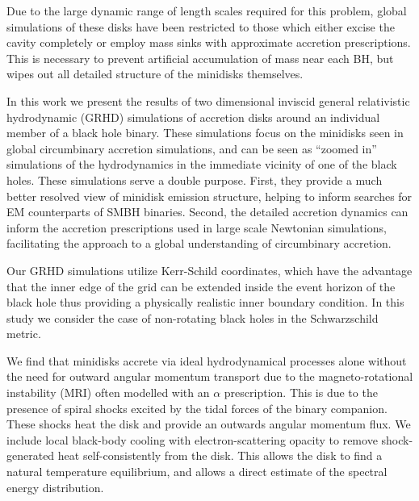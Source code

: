 \documentclass{emulateapj}
\begin{document}
Due to the large dynamic range of length scales required for this problem, global simulations of these disks have been restricted to those which either excise the cavity completely or employ mass sinks with approximate accretion prescriptions.  This is necessary to prevent artificial accumulation of mass near each BH, but wipes out all detailed structure of the minidisks themselves.

In this work we present the results of two dimensional inviscid general relativistic hydrodynamic (GRHD) simulations of accretion disks around an individual member of a black hole binary. These simulations focus on the minidisks seen in global circumbinary accretion simulations, and can be seen as ``zoomed in'' simulations of the hydrodynamics in the immediate vicinity of one of the black holes.  These simulations serve a double purpose. First, they provide a much better resolved view of minidisk emission structure, helping to inform searches for EM counterparts of SMBH binaries.  Second, the detailed accretion dynamics can inform the accretion prescriptions used in large scale Newtonian simulations, facilitating the approach to a global understanding of circumbinary accretion.

Our GRHD simulations utilize Kerr-Schild coordinates, which have the advantage that the inner edge of the grid can be extended inside the event horizon of the black hole thus providing a physically realistic inner boundary condition. In this study we consider the case of non-rotating black holes in the Schwarzschild metric.


  We find that minidisks accrete via ideal hydrodynamical processes alone without the need for outward angular momentum transport due to the magneto-rotational instability (MRI) often modelled with an $\alpha$ prescription.
This is due to the presence of spiral shocks excited by the tidal forces of the binary companion. These shocks heat the disk and provide an outwards angular momentum flux. We include local 
black-body cooling with electron-scattering opacity to remove shock-generated
heat self-consistently from the disk.  This allows the disk to find a natural
temperature equilibrium, and allows a direct estimate of the spectral energy distribution.
\end{document}
